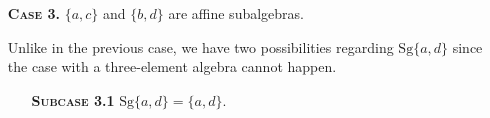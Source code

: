 \documentclass[11pt]{amsart}
\theoremstyle{definition}
\theoremstyle{remark}
\theoremstyle{plain}
\begin{document}
\begin{enumerate}[wide, labelindent=0pt]
\begin{enumerate}[wide, labelindent=0pt]
\begin{proof}
\begin{equation}
\begin{bmatrix}
c \\
c
\end{bmatrix}
\right)=
\begin{bmatrix}
d \\
b\\
b
\end{bmatrix}.
\end{equation}
Finally, we define the cyclic term $g^*$ by $$g^*(x,y,z)=g'(w(x,y,z),w(y,z,x),w(z,x,y)).$$ From \eqref{eq for w} and \eqref{eq for w 2} follows that $\{a,b\}$ is closed for cyclic term $g^*$, which concludes the proof.
\end{proof}
   
   
\end{enumerate}

  \item[\textsc{\textbf{Case 3.}}] $\{a,c\}$ and $\{b,d\}$ are affine subalgebras.

Unlike in the previous case, we have two possibilities regarding $\mathrm{Sg}\{a,d\}$ since the case with a three-element algebra cannot happen.

\begin{enumerate}[wide, labelindent=0pt]
    \item[\textsc{\textbf{Subcase 3.1}}] $\mathrm{Sg}\{a,d\}=\{a,d\}$.
    

\end{enumerate}
\end{enumerate}
\end{document}
